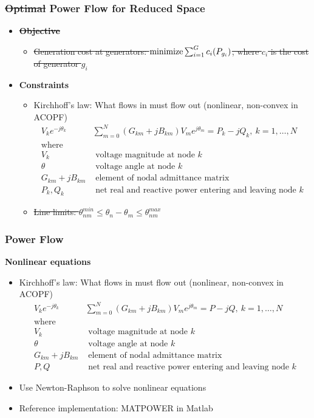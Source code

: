 \begin{frame}[fragile]
  \frametitle{\sout{Optimal} Power Flow for Reduced Space}
  \begin{itemize}
    \item {\bf \sout{Objective}}
    \begin{itemize}
      \item \sout{Generation cost at generators:
      $ \minimize \sum^G_{i=1} c_i(P_{g_i})$, where $c_i$ is the cost of generator $g_i$}
    \end{itemize}
    \item {\bf Constraints}
    \begin{itemize}
      \item Kirchhoff's law: What flows in must flow out (nonlinear, non-convex in ACOPF)
      \begin{align*}
        V_k e^{-j\theta_k} & \sum^{N}_{m=0} (G_{km} + jB_{km})V_m e^{j\theta_m} = P_k - j Q_k,\ k = 1, \dots, N \\
        \text{where}\\
        V_k &\text{ voltage magnitude at node } k\\
        \theta &\text{ voltage angle at node } k\\
        G_{km} + jB_{km}& \text{ element of nodal admittance matrix}\\
        P_k , Q_k &\text{ net real and reactive power entering and leaving node } k
      \end{align*}
      \item \sout{Line limits: $ \theta^{min}_{nm} \leq \theta_n - \theta_m \leq \theta^{max}_{nm}$}
    \end{itemize}
  \end{itemize}
\end{frame}

\begin{frame}[fragile]
  \frametitle{Power Flow}
  {\bf Nonlinear equations}
  \begin{itemize}
      \item Kirchhoff's law: What flows in must flow out (nonlinear, non-convex in ACOPF)
      \begin{align*}
        V_k e^{-j\theta_k} & \sum^{N}_{m=0} (G_{km} + jB_{km})V_m e^{j\theta_m} = P - jQ,\ k = 1, \dots, N \\
        \text{where}\\
        V_k &\text{ voltage magnitude at node } k\\
        \theta &\text{ voltage angle at node } k\\
        G_{km} + jB_{km}& \text{ element of nodal admittance matrix}\\
        P, Q &\text{ net real and reactive power entering and leaving node } k
      \end{align*}
      \item Use Newton-Raphson to solve nonlinear equations
      \item Reference implementation: MATPOWER in Matlab
  \end{itemize}
\end{frame}

